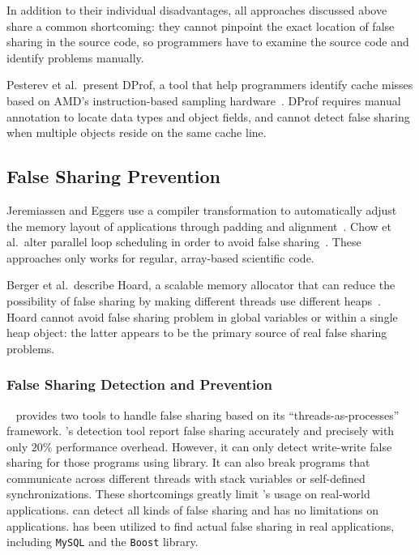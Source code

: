 In addition to their individual disadvantages,
all approaches discussed above share a common shortcoming:  
they cannot pinpoint the exact location of false sharing in the source code, so programmers have to examine the source code and identify problems manually.

Pesterev et al.\ present DProf, a tool that help programmers identify cache misses based on AMD's instruction-based sampling hardware~\cite{DProf}. DProf requires manual annotation to locate data types and object fields, and cannot detect false sharing when multiple objects reside on the same cache line.

\subsection{False Sharing Prevention}
Jeremiassen and Eggers use a compiler transformation to automatically adjust the memory layout of applications through padding and alignment~\cite{falseshare:compile}. Chow et al.\ alter parallel loop scheduling in order to avoid false
sharing~\cite{falseshare:schedule}. These approaches only works for regular, array-based scientific code.

Berger et al.\ describe Hoard, a scalable memory allocator that can reduce the possibility of false sharing by making different threads use different heaps~\cite{Hoard}. Hoard cannot avoid false sharing problem in global variables or within
a single heap object: the latter appears to be the primary source of real false sharing problems.

\subsubsection{False Sharing Detection and Prevention}
\sheriff{}~\cite{sheriff} provides two tools to handle false sharing based on its ``threads-as-processes'' framework.
\Sheriff{}'s detection tool report false sharing accurately and precisely with only $20\%$ performance overhead.
However, it can only detect write-write false sharing for those programs using \pthreads{} library. It can also break programs that communicate across different threads with stack variables or self-defined synchronizations. These shortcomings greatly limit \Sheriff{}'s usage on real-world applications.  
\Predator{} can detect all kinds of false sharing and has no limitations on applications. \Predator{} has been utilized to find actual false sharing in real applications, including \texttt{MySQL} and the \texttt{Boost} library.


